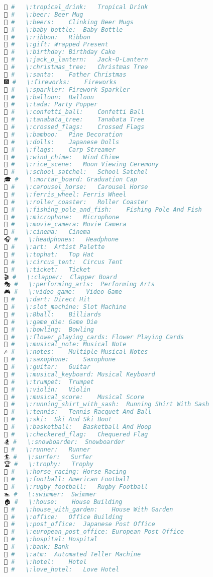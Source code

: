 \begin{lstlisting}[language=Julia]
🍹 #   \:tropical_drink:   Tropical Drink
🍺 #   \:beer: Beer Mug
🍻 #   \:beers:    Clinking Beer Mugs
🍼 #   \:baby_bottle:  Baby Bottle
🎀 #   \:ribbon:   Ribbon
🎁 #   \:gift: Wrapped Present
🎂 #   \:birthday: Birthday Cake
🎃 #   \:jack_o_lantern:   Jack-O-Lantern
🎄 #   \:christmas_tree:   Christmas Tree
🎅 #   \:santa:    Father Christmas
🎆 #   \:fireworks:    Fireworks
🎇 #   \:sparkler: Firework Sparkler
🎈 #   \:balloon:  Balloon
🎉 #   \:tada: Party Popper
🎊 #   \:confetti_ball:    Confetti Ball
🎋 #   \:tanabata_tree:    Tanabata Tree
🎌 #   \:crossed_flags:    Crossed Flags
🎍 #   \:bamboo:   Pine Decoration
🎎 #   \:dolls:    Japanese Dolls
🎏 #   \:flags:    Carp Streamer
🎐 #   \:wind_chime:   Wind Chime
🎑 #   \:rice_scene:   Moon Viewing Ceremony
🎒 #   \:school_satchel:   School Satchel
🎓 #   \:mortar_board: Graduation Cap
🎠 #   \:carousel_horse:   Carousel Horse
🎡 #   \:ferris_wheel: Ferris Wheel
🎢 #   \:roller_coaster:   Roller Coaster
🎣 #   \:fishing_pole_and_fish:    Fishing Pole And Fish
🎤 #   \:microphone:   Microphone
🎥 #   \:movie_camera: Movie Camera
🎦 #   \:cinema:   Cinema
🎧 #   \:headphones:   Headphone
🎨 #   \:art:  Artist Palette
🎩 #   \:tophat:   Top Hat
🎪 #   \:circus_tent:  Circus Tent
🎫 #   \:ticket:   Ticket
🎬 #   \:clapper:  Clapper Board
🎭 #   \:performing_arts:  Performing Arts
🎮 #   \:video_game:   Video Game
🎯 #   \:dart: Direct Hit
🎰 #   \:slot_machine: Slot Machine
🎱 #   \:8ball:    Billiards
🎲 #   \:game_die: Game Die
🎳 #   \:bowling:  Bowling
🎴 #   \:flower_playing_cards: Flower Playing Cards
🎵 #   \:musical_note: Musical Note
🎶 #   \:notes:    Multiple Musical Notes
🎷 #   \:saxophone:    Saxophone
🎸 #   \:guitar:   Guitar
🎹 #   \:musical_keyboard: Musical Keyboard
🎺 #   \:trumpet:  Trumpet
🎻 #   \:violin:   Violin
🎼 #   \:musical_score:    Musical Score
🎽 #   \:running_shirt_with_sash:  Running Shirt With Sash
🎾 #   \:tennis:   Tennis Racquet And Ball
🎿 #   \:ski:  Ski And Ski Boot
🏀 #   \:basketball:   Basketball And Hoop
🏁 #   \:checkered_flag:   Chequered Flag
🏂 #   \:snowboarder:  Snowboarder
🏃 #   \:runner:   Runner
🏄 #   \:surfer:   Surfer
🏆 #   \:trophy:   Trophy
🏇 #   \:horse_racing: Horse Racing
🏈 #   \:football: American Football
🏉 #   \:rugby_football:   Rugby Football
🏊 #   \:swimmer:  Swimmer
🏠 #   \:house:    House Building
🏡 #   \:house_with_garden:    House With Garden
🏢 #   \:office:   Office Building
🏣 #   \:post_office:  Japanese Post Office
🏤 #   \:european_post_office: European Post Office
🏥 #   \:hospital: Hospital
🏦 #   \:bank: Bank
🏧 #   \:atm:  Automated Teller Machine
🏨 #   \:hotel:    Hotel
🏩 #   \:love_hotel:   Love Hotel

\end{lstlisting}
